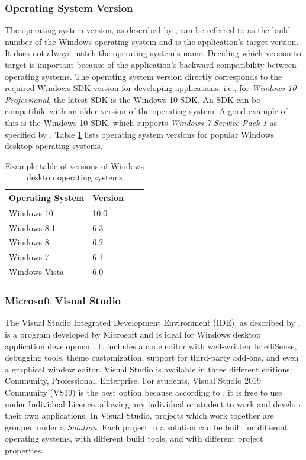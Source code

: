 \subsubsection{Operating System Version}
The operating system version, as described by \cite{OsVersion}, can be referred to as the build number of the Windows operating system and is the application's target version. It does not always match the operating system's name. Deciding which version to target is important because of the application's backward compatibility between operating systems. The operating system version directly corresponds to the required Windows SDK version for developing applications, i.e., for \textit{Windows 10 Professional}, the latest SDK is the Windows 10 SDK. An SDK can be compatibile with an older version of the operating system. A good example of this is the Windows 10 SDK, which supports \textit{Windows 7 Service Pack 1} as specified by \cite{Win10SDK}. Table \ref{osversions} lists operating system versions for popular Windows desktop operating systems.
\begin{table}[hbt]
\centering
\label{osversions}
\begin{tabular}{|l|l|l|l|}
\hline
Operating System & Version \\ \hline
Windows 10       & 10.0    \\ \hline
Windows 8.1      & 6.3     \\ \hline
Windows 8        & 6.2     \\ \hline
Windows 7        & 6.1     \\ \hline
Windows Vista    & 6.0     \\ \hline
\end{tabular}
\caption{Example table of versions of Windows desktop operating systems}
\end{table}

\subsubsection{Microsoft Visual Studio}
\label{ch2vs19}
The Visual Studio Integrated Development Environment (IDE), as described by \cite{VStudio}, is a program developed by Microsoft and is ideal for Windows desktop application development. It includes a code editor with well-written IntelliSense, debugging tools, theme customization, support for third-party add-ons, and even a graphical window editor. Visual Studio is available in three different editions: Community, Professional, Enterprise. For students, Visual Studio 2019 Community (VS19) is the best option because according to \cite{VS19TOS}, it is free to use under Individual Licence, allowing any individual or student to work and develop their own applications. In Visual Studio, projects which work together are grouped under a \textit{Solution}. Each project in a solution can be built for different operating systems, with different build tools, and with different project properties.

